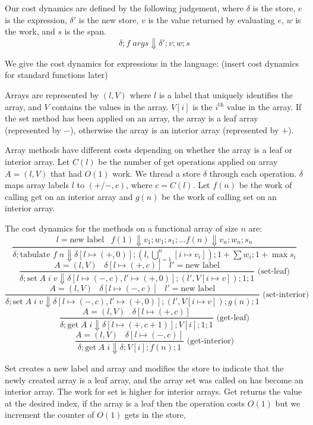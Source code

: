 \documentclass[preprint]{sigplanconf}
\begin{document}
Our cost dynamics are defined by the following judgement, where $\delta$ is the store, $e$ is the expression, $\delta'$ is the new store, $v$ is the value returned by evaluating $e$, $w$ is the work, and $s$ is the span.
$$\delta; f \; args \boldsymbol\Downarrow \delta'; v; w; s$$

We give the cost dynamics for expressions in the language: (insert cost dynamics for standard functions later)

Arrays are represented by $(l, V)$ where $l$ is a label that uniquely identifies the array, and $V$ contains the values in the array. $V[i]$ is the $i^{\text{th}}$ value in the array. If the set method has been applied on an array, the array is a leaf array (represented by $-$), otherwise the array is an interior array (represented by $+$). 

Array methods have different costs depending on whether the array is a leaf or interior array. Let $C(l)$ be the number of get operations applied on array $A = (l, V)$ that had $O(1)$ work. We thread a store $\delta$ through each operation. $\delta$ maps array labels $l$ to $(+/-, c)$, where $c = C(l)$. Let $f(n)$ be the work of calling get on an interior array and $g(n)$ be the work of calling set on an interior array.

The cost dynamics for the methods on a functional array of size $n$ are:
$$\frac{l = \text{new label} \;\;\; f(1) \Downarrow v_1; w_1; s_1; ... f(n) \Downarrow v_{n}; w_{n}; s_{n}}{\delta; \text{tabulate } f \; n \Downarrow \delta[l \mapsto (+, 0)]; (l, \bigcup_{i=1}^n [i \mapsto v_i]); 1+\sum w_i; 1+\max s_i}$$
$$\frac{A = (l,V) \;\;\; \delta[l \mapsto (+, c)] \;\;\; l' = \text{new label}}{\delta; \text{set} \; A \; i \; v \Downarrow \delta[l \mapsto (-, c), l' \mapsto (+, 0)]; (l', V[i \mapsto v]); 1; 1} \text{  (set-leaf)}$$
$$\frac{A = (l,V) \;\;\; \delta[l \mapsto (-, c)] \;\;\;  l' = \text{new label}}{\delta; \text{set} \; A \; i \; v \Downarrow \delta[l \mapsto (-, c), l' \mapsto (+, 0)]; (l', V[i \mapsto v]); g(n); 1} \text{  (set-interior)}$$
$$\frac{A = (l,V) \;\;\; \delta[l \mapsto (+, c)]}{\delta; \text{get} \; A \; i \Downarrow \delta[l \mapsto (+, c+1)]; V[i]; 1; 1} \text{  (get-leaf)}$$
$$\frac{A = (l,V) \;\;\; \delta[l \mapsto (-, c)]}{\delta; \text{get} \; A \; i \Downarrow \delta; V[i]; f(n); 1} \text{  (get-interior)}$$

Set creates a new label and array and modifies the store to indicate that the newly created array is a leaf array, and the array set was called on has become an interior array. The work for set is higher for interior arrays. Get returns the value at the desired index, if the array is a leaf then the operation costs $O(1)$ but we increment the counter of $O(1)$ gets in the store,
\end{document}
